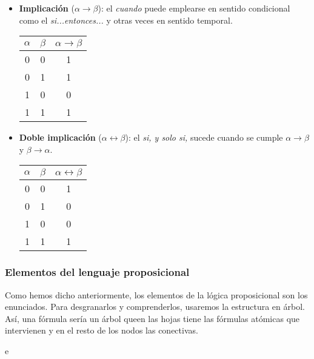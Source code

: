 \begin{itemize}
    \item \textbf{Implicación} ($\alpha \rightarrow \beta$): el \textit{cuando} puede emplearse en sentido condicional como el \textit{si...entonces...} y otras veces en sentido temporal.
          \begin{center}
              \begin{tabular}{ |c|c|c|  }
                  \hline
                  $\alpha$ & $\beta$ & $\alpha \rightarrow \beta$ \\
                  \hline
                  0        & 0       & 1                          \\
                  0        & 1       & 1                          \\
                  1        & 0       & 0                          \\
                  1        & 1       & 1                          \\
                  \hline
              \end{tabular}
          \end{center}

    \item \textbf{Doble implicación} ($\alpha \leftrightarrow \beta$): el \textit{si, y solo si,} sucede cuando se cumple $\alpha \rightarrow \beta$ y $\beta \rightarrow \alpha$.
          \begin{center}
              \begin{tabular}{ |c|c|c|  }
                  \hline
                  $\alpha$ & $\beta$ & $\alpha \leftrightarrow \beta$ \\
                  \hline
                  0        & 0       & 1                              \\
                  0        & 1       & 0                              \\
                  1        & 0       & 0                              \\
                  1        & 1       & 1                              \\
                  \hline
              \end{tabular}
          \end{center}
\end{itemize}

\subsubsection{Elementos del lenguaje proposicional}
Como hemos dicho anteriormente, los elementos de la lógica proposicional son los enunciados. Para desgranarlos y comprenderlos, usaremos la estructura en árbol.
Así, una fórmula sería un árbol queen las hojas tiene las fórmulas atómicas que intervienen y en el resto de los nodos las conectivas.
\begin{ejemplo}
    e
\end{ejemplo}

